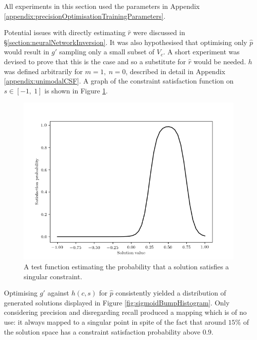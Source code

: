 \documentclass[../../main.tex]{subfiles}
\begin{document}
All experiments in this section used the parameters in Appendix \ref{appendix:precisionOptimisationTrainingParameters}.

Potential issues with directly estimating $\hat{r}$ were discussed in \S\ref{section:neuralNetworkInversion}.
It was also hypothesised that optimising only $\hat{p}$ would result in $g'$ sampling only a small subset of $V_c$.
A short experiment was devised to prove that this is the case and so a substitute for $\hat{r}$ would be needed.
$h$ was defined arbitrarily for $m=1,\;n=0$, described in detail in Appendix \ref{appendix:unimodalCSF}.
A graph of the constraint satisfaction function on $s\in[-1,\;1]$ is shown in Figure \ref{fig:sigmoidBumpFunction}.
\begin{figure}[H]
    \begin{center}
    \includegraphics[width=\textwidth]{sigmoidBumpFunction}
    \caption{
        A test function estimating the probability that a solution satisfies a singular constraint.
    }
    \label{fig:sigmoidBumpFunction}
    \end{center}
\end{figure}
Optimising $g'$ against $h(c,s)$ for $\hat{p}$ consistently yielded a distribution of generated solutions displayed in Figure \ref{fig:sigmoidBumpHistogram}.
Only considering precision and disregarding recall produced a mapping which is of no use: it always mapped to a singular point in spite of the fact that around $15\%$ of the solution space has a constraint satisfaction probability above $0.9$.
\end{document}
